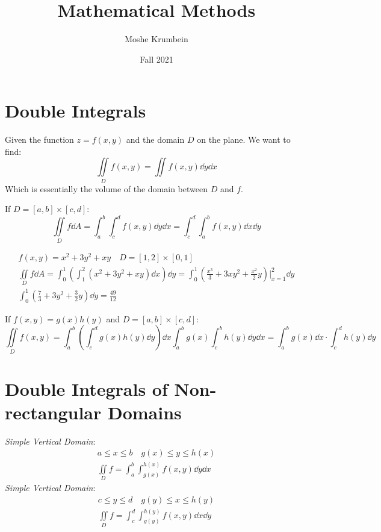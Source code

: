 


\title{Mathematical Methods}
\author{Moshe Krumbein}
\date{Fall 2021}



\section{Double Integrals}
Given the function $z=f(x,y)$ and the domain $D$ on the plane. We want to find:
$$\iint\limits_Df(x,y)=\iint f(x,y)\dd{y}\dd{x}$$
Which is essentially the volume of the domain between $D$ and $f$.
\begin{definition}
    If $D=[a,b]\times[c,d]$:
    $$\iint\limits_D f \dd{A}= \int_{a}^{b}\int_{c}^{d}
    f(x,y)\dd{y}\dd{x}=\int_{c}^{d}\int_{a}^{b} f(x,y)\dd{x}\dd{y}$$
\end{definition}
\begin{example}
    \begin{gather*}
        f(x,y)=x^2+3y^2+xy \quad D=[1,2]\times[0,1] \\
        \iint\limits_D f\dd{A} =
        \int_{0}^{1}\left(\int_{1}^{2}(x^2+3y^2+xy)\dd{x}\right)\dd{y} =
        \int_{0}^{1}\left(\frac{x^3}{3}+3xy^2+\frac{x^2}{2}y\right)\Biggr|_{x=1}^2\dd{y}
        \\
        \int_{0}^{1}\left(\frac{7}{3}+3y^2+\frac{3}{2}y\right)\dd{y}
        =\frac{49}{12}
    \end{gather*}
\end{example}
\begin{note}
    If $f(x,y)=g(x)h(y)$ and $D=[a,b]\times[c,d]$:
    $$\iint\limits_Df(x,y)=\int_{a}^{b}\left(\int_{c}^{d}g(x)h(y)\dd{y}\right)\dd{x}
    \int_{a}^{b}g(x)\int_{c}^{b}h(y)\dd{y}\dd{x} =
    \int_{a}^{b}g(x)\dd{x}\cdot\int_{c}^{d}h(y)\dd{y}
    $$
\end{note}
\section{Double Integrals of Non-rectangular Domains}
\emph{Simple Vertical Domain}:
\begin{gather*}
    a \leq x \leq b \quad g(x) \leq y \leq h(x) \\
    \iint\limits_D f= \int_{a}^{b}\int_{g(x)}^{h(x)}f(x,y)\dd{y}\dd{x}
\end{gather*}
\emph{Simple Vertical Domain}:
\begin{gather*}
    c \leq y \leq d \quad g(y) \leq x \leq h(y) \\
    \iint\limits_D f= \int_{c}^{d}\int_{g(y)}^{h(y)}f(x,y)\dd{x}\dd{y}
\end{gather*}
